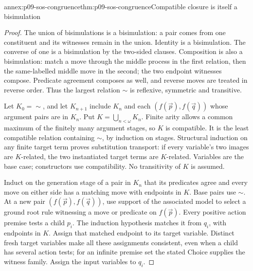 \begin{annexitem}{annex:p09-sos-congruence}{thm:p09-sos-congruence}{Compatible closure is itself a bisimulation}
\begin{proof}
The union of bisimulations is a bisimulation: a pair comes from
one constituent and its witnesses remain in the union. Identity
is a bisimulation. The converse of one is a bisimulation by the
two-sided clauses. Composition is also a bisimulation: match a
move through the middle process in the first relation, then the
same-labelled middle move in the second; the two endpoint witnesses
compose. Predicate agreement composes as well, and reverse moves
are treated in reverse order. Thus the largest relation \(\sim\)
is reflexive, symmetric and transitive.

Let \(K_0=\sim\), and let \(K_{n+1}\) include \(K_n\)
and each \((f(\vec p),f(\vec q))\) whose argument pairs are
in \(K_n\). Put \(K=\bigcup_{n<\omega}K_n\). Finite arity
allows a common maximum of the finitely many argument stages,
so \(K\) is compatible. It is the least compatible relation
containing \(\sim\), by induction on stages. Structural induction
on any finite target term proves substitution transport: if every
variable's two images are \(K\)-related, the two instantiated
target terms are \(K\)-related. Variables are the base case;
constructors use compatibility. No transitivity of \(K\) is assumed.

Induct on the generation stage of a pair in \(K_n\) that its
predicates agree and every move on either side has a matching move
with endpoints in \(K\). Base pairs use \(\sim\). At a new
pair \((f(\vec p),f(\vec q))\), use support of the associated
model to select a ground root rule witnessing a move or predicate
on \(f(\vec p)\). Every positive action premise tests a child
\(p_i\). The induction hypothesis matches it from \(q_i\),
with endpoints in \(K\). Assign that matched endpoint to its
target variable. Distinct fresh target variables make all these
assignments consistent, even when a child has several action tests;
for an infinite premise set the stated Choice supplies the witness
family. Assign the input variables to \(q_i\).


\end{proof}
\end{annexitem}
